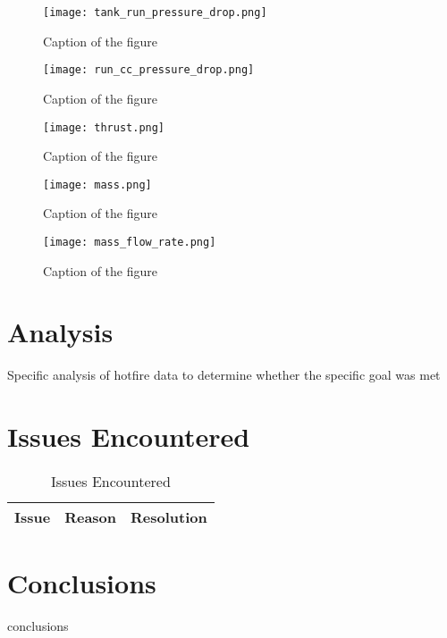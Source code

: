 \documentclass[letterpaper,12pt]{article}
\begin{document}
\begin{figure}[H]
    \centering
    \texttt{[image: tank\_run\_pressure\_drop.png]}
    \caption{Caption of the figure}
    \label{fig:labelname}
\end{figure}

\begin{figure}[H]
    \centering
    \texttt{[image: run\_cc\_pressure\_drop.png]}
    \caption{Caption of the figure}
    \label{fig:labelname}
\end{figure}

\begin{figure}[H]
    \centering
    \texttt{[image: thrust.png]}
    \caption{Caption of the figure}
    \label{fig:labelname}
\end{figure}

\begin{figure}[H]
    \centering
    \texttt{[image: mass.png]}
    \caption{Caption of the figure}
    \label{fig:labelname}
\end{figure}

\begin{figure}[H]
    \centering
    \texttt{[image: mass\_flow\_rate.png]}
    \caption{Caption of the figure}
    \label{fig:labelname}
\end{figure}

\section{Analysis}
Specific analysis of hotfire data to determine whether the specific goal was met

\section{Issues Encountered}
\begin{table}[H]
\begin{center}
\caption{Issues Encountered}
\label{tbl:issues}
\begin{tabular}{|c|c|c|}
\hline
\textbf{Issue} & \textbf{Reason} & \textbf{Resolution} \\
\hline

\hline
\end{tabular}
\end{center}
\end{table}

\section{Conclusions}
{{ conclusions }}
\end{document}
